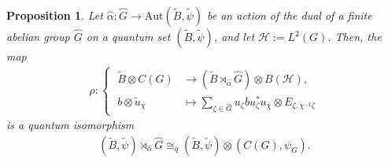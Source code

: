 \documentclass{amsart}
\newtheorem{proposition}[thm]{Proposition}
\theoremstyle{definition}
\theoremstyle{definition}
\begin{document}
\begin{proposition}
    \label{land::prop:quantum_isomorphism_between_crossed_product_and_tensor_product}
    Let $\hat{\alpha}: \hat{G} \to \mathrm{Aut}(\tilde{B}, \tilde{\psi})$ be an action of the dual of a finite abelian group $\hat{G}$ on a quantum set $(\tilde{B}, \tilde{\psi})$, and let $\mathcal{H} := L^2(G)$.
    Then, the map
    \begin{align*}
        \rho: \left\{ \;
        \begin{aligned}   
            \tilde{B} \otimes C(G) &\to \left(\tilde{B} \rtimes_{\hat{\alpha}} \hat{G}\right) \otimes B(\mathcal{H}), \\
            b \otimes \tilde{u}_\chi &\mapsto \sum_{\zeta \in \hat{G}} u_\zeta b u_\zeta^\ast u_\chi \otimes E_{\zeta, \chi^{-1} \zeta}
        \end{aligned}\right.
    \end{align*}
    is a quantum isomorphism
    \begin{align*}
        (\tilde{B}, \tilde{\psi}) \rtimes_{\hat{\alpha}} \hat{G} \cong_q (\tilde{B}, \tilde{\psi}) \otimes (C(G), \psi_G).
    \end{align*}
\end{proposition}
\end{document}
